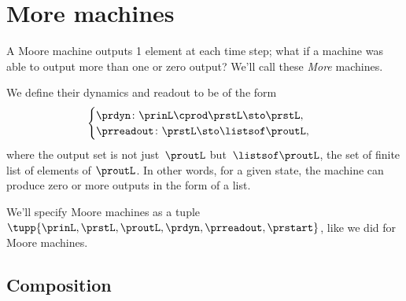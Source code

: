 
\section{More machines}
\label{sec:more-machines}

A Moore machine outputs 1 element at each time step; what if a machine was able to output more than one or zero output?
We'll call these \emph{More} machines.

We define their dynamics and readout to be of the form
%
\begin{equation}
    \label{eq:more-signature}
    \begin{cases}
        \prdyn \colon  \prinL \cprod \prstL \sto \prstL, \\
        \prreadout \colon \prstL  \sto \listsof \proutL,
    \end{cases}
\end{equation}
%
where the output set is not just~$\proutL$ but~$\listsof \proutL$, the set of finite list of elements of $\proutL$.
In other words, for a given state, the machine can produce zero or more outputs in the form of a list.

We'll specify Moore machines as a tuple $\tupp{\prinL,\prstL,\proutL,\prdyn,\prreadout,\prstart}$, like we did for Moore machines.

\subsection{Composition}

